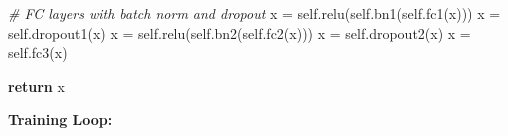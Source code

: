 \documentclass[
]{article}
\newenvironment{Shaded}{}{}
\newcommand{\CommentTok}[1]{\textcolor[rgb]{0.38,0.63,0.69}{\textit{#1}}}
\newcommand{\ControlFlowTok}[1]{\textcolor[rgb]{0.00,0.44,0.13}{\textbf{#1}}}
\newcommand{\NormalTok}[1]{#1}
\newcommand{\OperatorTok}[1]{\textcolor[rgb]{0.40,0.40,0.40}{#1}}
\newcommand{\VariableTok}[1]{\textcolor[rgb]{0.10,0.09,0.49}{#1}}
\begin{document}
\begin{Shaded}
\begin{Highlighting}[]
        \CommentTok{\# FC layers with batch norm and dropout}
\NormalTok{        x }\OperatorTok{=} \VariableTok{self}\NormalTok{.relu(}\VariableTok{self}\NormalTok{.bn1(}\VariableTok{self}\NormalTok{.fc1(x)))}
\NormalTok{        x }\OperatorTok{=} \VariableTok{self}\NormalTok{.dropout1(x)}
\NormalTok{        x }\OperatorTok{=} \VariableTok{self}\NormalTok{.relu(}\VariableTok{self}\NormalTok{.bn2(}\VariableTok{self}\NormalTok{.fc2(x)))}
\NormalTok{        x }\OperatorTok{=} \VariableTok{self}\NormalTok{.dropout2(x)}
\NormalTok{        x }\OperatorTok{=} \VariableTok{self}\NormalTok{.fc3(x)}
        
        \ControlFlowTok{return}\NormalTok{ x}
\end{Highlighting}
\end{Shaded}

\textbf{Training Loop:}
\end{document}

